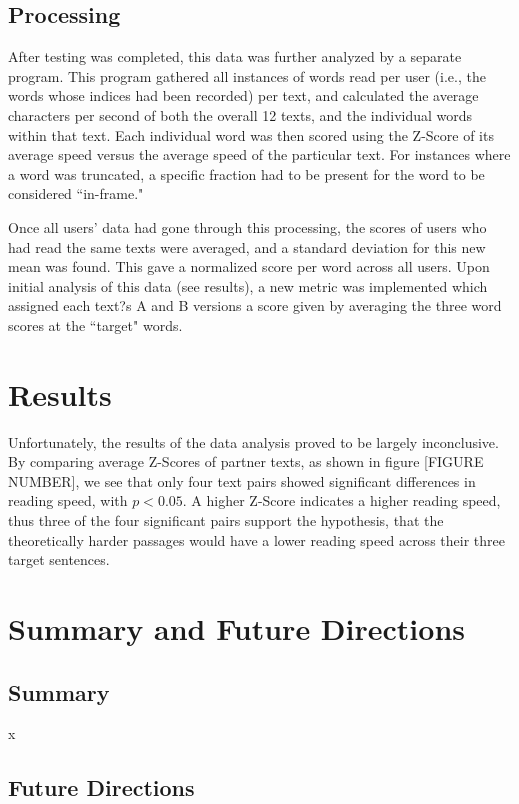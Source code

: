 \documentclass[11pt,letterpaper]{article}
\begin{document}
	\subsection{Processing}
	
	After testing was completed, this data was further analyzed by a separate program. This program gathered all instances of words read per user (i.e., the words whose indices had been recorded) per text, and calculated the average characters per second of both the overall 12 texts, and the individual words within that text. Each individual word was then scored using the Z-Score of its average speed versus the average speed of the particular text. For instances where a word was truncated, a specific fraction had to be present for the word to be considered ``in-frame."
	
	
	Once all users' data had gone through this processing, the scores of users who had read the same texts were averaged, and a standard deviation for this new mean was found. This gave a normalized score per word across all users. Upon initial analysis of this data (see results), a new metric was implemented which assigned each text?s A and B versions a score given by averaging the three word scores at the ``target" words.
	
	
	\section{Results}
	
	Unfortunately, the results of the data analysis proved to be largely inconclusive. By comparing average Z-Scores of partner texts, as shown in figure [FIGURE NUMBER], we see that only four text pairs showed significant differences in reading speed, with $p < 0.05$. A higher Z-Score indicates a higher reading speed, thus three of the four significant pairs support the hypothesis, that the theoretically harder passages would have a lower reading speed across their three target sentences.
	
	\section{Summary and Future Directions}
	
	\subsection{Summary}
	
	x
	
	\subsection{Future Directions}
	
\end{document}
